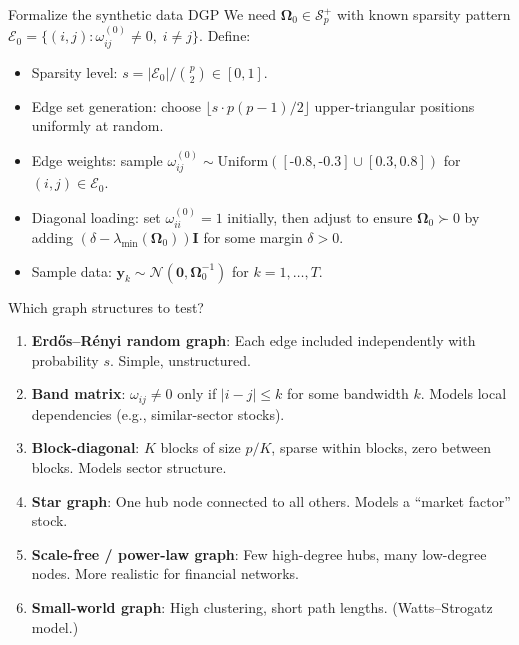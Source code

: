 \documentclass[11pt,a4paper]{article}
\newcommand{\Normal}{\mathcal{N}}
\newcommand{\Spp}{\mathcal{S}^{+}_p}
\newcommand{\bOmega}{\bm{\Omega}}
\begin{document}
\begin{mathbox}{Formalize the synthetic data DGP}
We need $\bOmega_0 \in \Spp$ with known sparsity pattern $\mathcal{E}_0 = \{(i,j) : \omega_{ij}^{(0)} \neq 0,\; i \neq j\}$. Define:
\begin{itemize}[nosep]
  \item Sparsity level: $s = |\mathcal{E}_0| / \binom{p}{2} \in [0,1]$.
  \item Edge set generation: choose $\lfloor s \cdot p(p-1)/2 \rfloor$ upper-triangular positions uniformly at random.
  \item Edge weights: sample $\omega_{ij}^{(0)} \sim \text{Uniform}([\text{-}0.8, \text{-}0.3] \cup [0.3, 0.8])$ for $(i,j) \in \mathcal{E}_0$.
  \item Diagonal loading: set $\omega_{ii}^{(0)} = 1$ initially, then adjust to ensure $\bOmega_0 \succ 0$ by adding $(\delta - \lambda_{\min}(\bOmega_0))\bm{I}$ for some margin $\delta > 0$.
  \item Sample data: $\bm{y}_k \sim \Normal(\bm{0}, \bOmega_0^{-1})$ for $k=1,\ldots,T$.
\end{itemize}
\end{mathbox}

\begin{decision}{Which graph structures to test?}
\begin{enumerate}[nosep]
  \item[\textbf{(a)}] \textbf{Erd\H{o}s--R\'enyi random graph}: Each edge included independently with probability $s$. Simple, unstructured.
  \item[(b)] \textbf{Band matrix}: $\omega_{ij} \neq 0$ only if $|i-j| \leq k$ for some bandwidth $k$. Models local dependencies (e.g., similar-sector stocks).
  \item[(c)] \textbf{Block-diagonal}: $K$ blocks of size $p/K$, sparse within blocks, zero between blocks. Models sector structure.
  \item[(d)] \textbf{Star graph}: One hub node connected to all others. Models a ``market factor'' stock.
  \item[(e)] \textbf{Scale-free / power-law graph}: Few high-degree hubs, many low-degree nodes. More realistic for financial networks.
  \item[(f)] \textbf{Small-world graph}: High clustering, short path lengths. (Watts--Strogatz model.)
\end{enumerate}
\end{decision}
\end{document}
